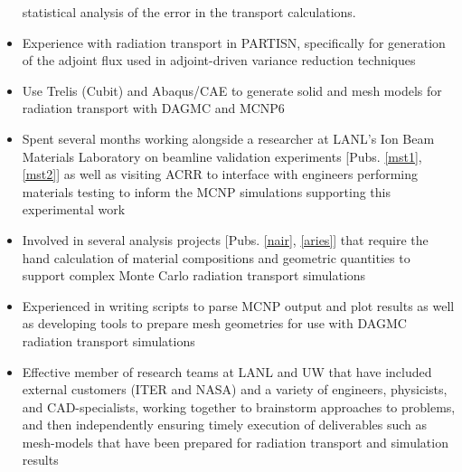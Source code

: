 \begin{center}
\begin{minipage}{\textwidth}
\begin{itemize}[leftmargin=.875in,rightmargin=.75in,itemsep=1.0mm]
                       statistical analysis of the error in the transport calculations.
              \item Experience with radiation transport in PARTISN, specifically
                    for generation of the adjoint flux used in adjoint-driven 
                    variance reduction techniques
              \item Use Trelis (Cubit) and Abaqus/CAE to generate solid and 
                    mesh models for radiation transport with DAGMC and MCNP6
		\item Spent several months working alongside a researcher
			at LANL's Ion Beam Materials Laboratory
			on beamline validation experiments 
		        [Pubs. \ref{mst1}, \ref{mst2}]
                        as well as
			visiting ACRR to interface with engineers performing
        			materials testing to inform the MCNP simulations
			supporting this experimental work
	       \item Involved in several analysis projects
		      [Pubs. \ref{nair}, \ref{aries}]	       
		     that require the hand calculation of material compositions
		     and geometric quantities to support complex Monte
		     Carlo radiation transport simulations
	       \item Experienced in writing scripts to parse MCNP output
	               and plot results as well as developing tools to 
		       prepare mesh geometries for use with DAGMC
		       radiation transport simulations
		\item Effective member of research teams at LANL and
		      UW that have included external customers (ITER and NASA) 
                      and a variety of engineers, physicists, and CAD-specialists,
                      working together to brainstorm approaches to problems,
                      and then independently
                      ensuring timely execution of deliverables such as
                      mesh-models
                      that have been prepared for radiation transport
                      and simulation results

\end{itemize}
\end{minipage}
\end{center}
